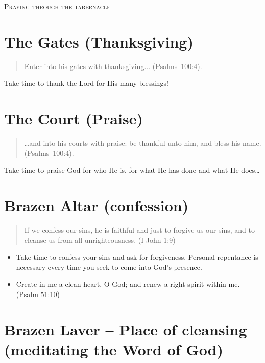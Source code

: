 \begin{center}
\mbox{}

\bigskip

\LARGE\textsc{Praying through the tabernacle}

\end{center}

\pagestyle{empty}
\setlength{\parindent}{0em}

\section{The Gates (Thanksgiving)}


\begin{quote}
Enter into his gates with thanksgiving... (Psalms~100:4).
\end{quote}

Take time to thank the Lord for His many blessings!


\section{The Court (Praise)}

\begin{quote}
    \dots{}and into his courts with praise: be thankful unto him, and bless his name. (Psalms~100:4).
\end{quote}

Take time to praise God for who He is, for what He has done and what He does\dots{}



\section{Brazen Altar (confession)}

\begin{quote}
If we confess our sins, he is faithful and just to forgive us our sins, and to cleanse us from all unrighteousness. (I John 1:9)
\end{quote}

\begin{itemize}
\item Take time to confess your sins and ask for forgiveness. Personal repentance is necessary every time you seek to come into God’s presence.
\item Create in me a clean heart, O God; and renew a right spirit within me. (Psalm 51:10)
\end{itemize}


\section{Brazen Laver – Place of cleansing (meditating the Word of God)}



